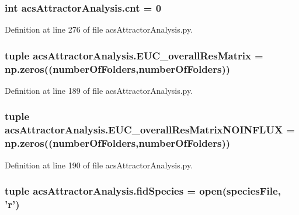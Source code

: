 \hypertarget{a00124_a8ec106a228fafb4c290946a7b7f8b6da}{
\subsubsection[{cnt}]{\setlength{\rightskip}{0pt plus 5cm}int acs\+Attractor\+Analysis.\+cnt = 0}}\label{a00124_a8ec106a228fafb4c290946a7b7f8b6da}


Definition at line 276 of file acs\+Attractor\+Analysis.\+py.

\hypertarget{a00124_a920167afed4efad8feefc27bdbadba89}{
\subsubsection[{E\+U\+C\+\_\+overall\+Res\+Matrix}]{\setlength{\rightskip}{0pt plus 5cm}tuple acs\+Attractor\+Analysis.\+E\+U\+C\+\_\+overall\+Res\+Matrix = np.\+zeros(({\bf number\+Of\+Folders},{\bf number\+Of\+Folders}))}}\label{a00124_a920167afed4efad8feefc27bdbadba89}


Definition at line 189 of file acs\+Attractor\+Analysis.\+py.

\hypertarget{a00124_a4214c876be4247f0643fc749beb35787}{
\subsubsection[{E\+U\+C\+\_\+overall\+Res\+Matrix\+N\+O\+I\+N\+F\+L\+U\+X}]{\setlength{\rightskip}{0pt plus 5cm}tuple acs\+Attractor\+Analysis.\+E\+U\+C\+\_\+overall\+Res\+Matrix\+N\+O\+I\+N\+F\+L\+U\+X = np.\+zeros(({\bf number\+Of\+Folders},{\bf number\+Of\+Folders}))}}\label{a00124_a4214c876be4247f0643fc749beb35787}


Definition at line 190 of file acs\+Attractor\+Analysis.\+py.

\hypertarget{a00124_a604c9f75892d8d8aeac8306c94630a23}{
\subsubsection[{fid\+Species}]{\setlength{\rightskip}{0pt plus 5cm}tuple acs\+Attractor\+Analysis.\+fid\+Species = open({\bf species\+File}, '{\bf r}')}}\label{a00124_a604c9f75892d8d8aeac8306c94630a23}


